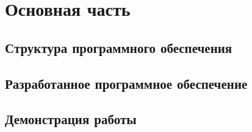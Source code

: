 \chapter{Основная часть}

\section{Структура программного обеспечения}



\section{Разработанное программное обеспечение}



\section{Демонстрация работы}

